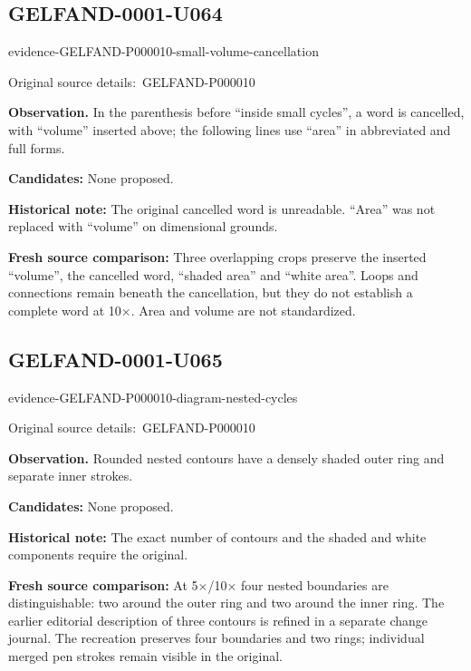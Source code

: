 \documentclass[11pt]{article}
\newcommand{\EvidenceBlock}[4]{%
 \par\smallskip\noindent\begin{minipage}{\linewidth}
 \begin{minipage}[t]{.47\linewidth}\vspace{0pt}\centering
 \csname evidence-#1-#2\endcsname\par
 {\scriptsize\SourceCropCaption\ #1}\par
 \end{minipage}\hfill
 \begin{minipage}[t]{.49\linewidth}\vspace{0pt}\raggedright
 {\small\color{orange!65!black}\textbf{#4} #3}\par
 \end{minipage}
 \end{minipage}\par\smallskip}
\newcommand{\SourceCropCaption}{Original source details:}\newcommand{\ReadingCaption}{Uncertain reading.}\newcommand{\IncompleteCaption}{Undeciphered passage.}\newcommand{\DiagramCaption}{Diagram and typed description.}
\begin{document}
\subsection*{GELFAND-0001-U064}
\EvidenceBlock{GELFAND-P000010}{small-volume-cancellation}{In the parenthesis before “inside small cycles”, a word is cancelled, with “volume” inserted above; the following lines use “area” in abbreviated and full forms.}{Observation.}
\par\smallskip\noindent\textbf{Candidates: } None proposed.\par
\par\smallskip\noindent\textbf{Historical note: } The original cancelled word is unreadable. “Area” was not replaced with “volume” on dimensional grounds.\par
\par\smallskip\noindent\textbf{Fresh source comparison: } Three overlapping crops preserve the inserted “volume”, the cancelled word, “shaded area” and “white area”. Loops and connections remain beneath the cancellation, but they do not establish a complete word at 10×. Area and volume are not standardized.\par

\subsection*{GELFAND-0001-U065}
\EvidenceBlock{GELFAND-P000010}{diagram-nested-cycles}{Rounded nested contours have a densely shaded outer ring and separate inner strokes.}{Observation.}
\par\smallskip\noindent\textbf{Candidates: } None proposed.\par
\par\smallskip\noindent\textbf{Historical note: } The exact number of contours and the shaded and white components require the original.\par
\par\smallskip\noindent\textbf{Fresh source comparison: } At 5×/10× four nested boundaries are distinguishable: two around the outer ring and two around the inner ring. The earlier editorial description of three contours is refined in a separate change journal. The recreation preserves four boundaries and two rings; individual merged pen strokes remain visible in the original.\par
\end{document}
